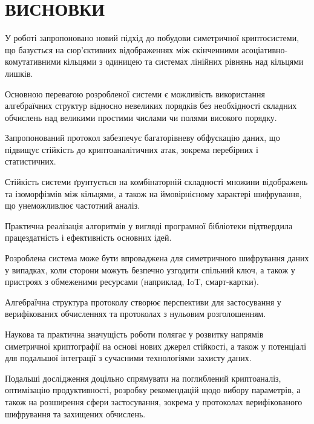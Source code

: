 \chapter*{ВИСНОВКИ}
{}

У роботі запропоновано новий підхід до побудови симетричної криптосистеми, що базується на сюр’єктивних відображеннях між скінченними асоціативно-комутативними кільцями з одиницею та системах лінійних рівнянь над кільцями лишків.

Основною перевагою розробленої системи є можливість використання алгебраїчних структур відносно невеликих порядків без необхідності складних обчислень над великими простими числами чи полями високого порядку.

Запропонований протокол забезпечує багаторівневу обфускацію даних, що підвищує стійкість до криптоаналітичних атак, зокрема перебірних і статистичних.

Стійкість системи ґрунтується на комбінаторній складності множини відображень та ізоморфізмів між кільцями, а також на ймовірнісному характері шифрування, що унеможливлює частотний аналіз.

Практична реалізація алгоритмів у вигляді програмної бібліотеки підтвердила працездатність і ефективність основних ідей.

Розроблена система може бути впроваджена для симетричного шифрування даних у випадках, коли сторони можуть безпечно узгодити спільний ключ, а також у пристроях з обмеженими ресурсами (наприклад, IoT, смарт-картки).

Алгебраїчна структура протоколу створює перспективи для застосування у верифікованих обчисленнях та протоколах з нульовим розголошенням.

Наукова та практична значущість роботи полягає у розвитку напрямів симетричної криптографії на основі нових джерел стійкості, а також у потенціалі для подальшої інтеграції з сучасними технологіями захисту даних.

Подальші дослідження доцільно спрямувати на поглиблений криптоаналіз, оптимізацію продуктивності, розробку рекомендацій щодо вибору параметрів, а також на розширення сфери застосування, зокрема у протоколах верифікованого шифрування та захищених обчислень.